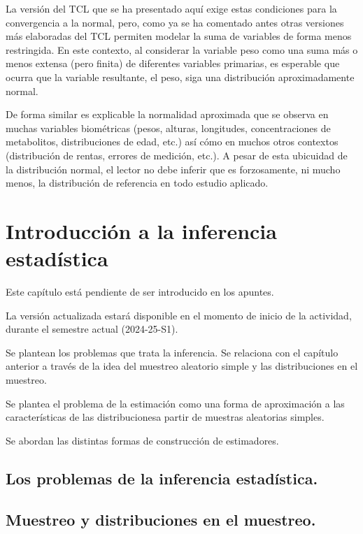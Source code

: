 \documentclass[
  a4paper,
  DIV=11,
  numbers=noendperiod]{scrreprt}
\begin{document}
La versión del TCL que se ha presentado aquí exige estas condiciones
para la convergencia a la normal, pero, como ya se ha comentado antes
otras versiones más elaboradas del TCL permiten modelar la suma de
variables de forma menos restringida. En este contexto, al considerar la
variable peso como una suma más o menos extensa (pero finita) de
diferentes variables primarias, es esperable que ocurra que la variable
resultante, el peso, siga una distribución aproximadamente normal.

De forma similar es explicable la normalidad aproximada que se observa
en muchas variables biométricas (pesos, alturas, longitudes,
concentraciones de metabolitos, distribuciones de edad, etc.) así cómo
en muchos otros contextos (distribución de rentas, errores de medición,
etc.). A pesar de esta ubicuidad de la distribución normal, el lector no
debe inferir que es forzosamente, ni mucho menos, la distribución de
referencia en todo estudio aplicado.


\chapter{Introducción a la inferencia
estadística}\label{introducciuxf3n-a-la-inferencia-estaduxedstica}

Este capítulo está pendiente de ser introducido en los apuntes.

La versión actualizada estará disponible en el momento de inicio de la
actividad, durante el semestre actual (2024-25-S1).

Se plantean los problemas que trata la inferencia. Se relaciona con el
capítulo anterior a través de la idea del muestreo aleatorio simple y
las distribuciones en el muestreo.

Se plantea el problema de la estimación como una forma de aproximación a
las características de las distribucionesa partir de muestras aleatorias
simples.

Se abordan las distintas formas de construcción de estimadores.

\section{Los problemas de la inferencia
estadística.}\label{los-problemas-de-la-inferencia-estaduxedstica.}

\section{Muestreo y distribuciones en el
muestreo.}\label{muestreo-y-distribuciones-en-el-muestreo.}
\end{document}
